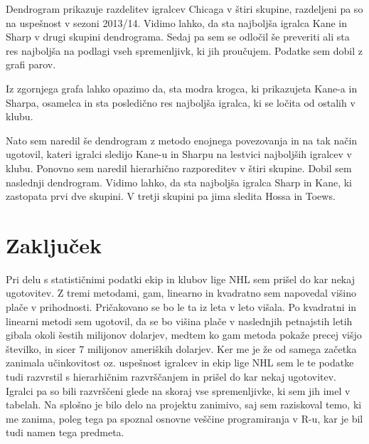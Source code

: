 \documentclass[11pt,a4paper]{article}
\begin{document}
Dendrogram prikazuje razdelitev igralcev Chicaga v štiri skupine, razdeljeni pa so na uspešnost v sezoni 2013/14. Vidimo lahko, da sta najboljša igralca Kane in Sharp v drugi skupini dendrograma. Sedaj pa sem se odločil še preveriti ali sta res najboljša na podlagi vseh spremenljivk, ki jih proučujem. Podatke sem dobil z grafi parov.


Iz zgornjega grafa lahko opazimo da, sta modra krogca, ki prikazujeta Kane-a in Sharpa, osamelca in sta posledično res najboljša igralca, ki se ločita od ostalih v klubu.


Nato sem naredil še dendrogram z metodo enojnega povezovanja in na tak način ugotovil, kateri igralci sledijo Kane-u in Sharpu na lestvici najboljših igralcev v klubu. Ponovno sem naredil hierarhično razporeditev v štiri skupine. Dobil sem naslednji dendrogram. Vidimo lahko, da sta najboljša igralca Sharp in Kane, ki zastopata prvi dve skupini. V tretji skupini pa jima sledita Hossa in Toews. 


\newpage
\section{Zaključek}

Pri delu s statističnimi podatki ekip in klubov lige NHL sem prišel do kar nekaj ugotovitev. Z tremi metodami, gam, linearno in kvadratno sem napovedal višino plače v prihodnosti. Pričakovano se bo le ta iz leta v leto višala. Po kvadratni in linearni metodi sem ugotovil, da se bo višina plače v naslednjih petnajstih letih gibala okoli šestih milijonov dolarjev, medtem ko gam metoda pokaže precej višjo številko, in sicer 7 milijonov ameriških dolarjev. Ker me je že od samega začetka zanimala učinkovitost oz. uspešnost igralcev in ekip lige NHL sem le te podatke tudi razvrstil s hierarhičnim razvrščanjem in prišel do kar nekaj ugotovitev. Igralci pa so bili razvrščeni glede na skoraj vse spremenljivke, ki sem jih imel v tabelah. Na splošno je bilo delo na projektu zanimivo, saj sem raziskoval temo, ki me zanima, poleg tega pa spoznal osnovne veščine programiranja v R-u, kar je bil tudi namen tega predmeta.

\begin{thebibliography}{9}
  \url{http://www.cbssports.com/mlb/salaries/avgsalaries}\\
  {Accessed: 01-03-2015}
  \url{http://www.nhl.com/ice/statshome.htm}\\
  {Accessed: 01-03-2015}
  \url{http://www.usatoday.com/sports/mlb/salaries/1988/team/all/}\\
  {{Accessed: 01-03-2015}
  \url{http://www.nhl.com/ice/teamstats.htm}\\
  {Accessed: 01-03-2015}
  \url{http://www.quanthockey.com/nhl/nationality-totals/nhl-players-2013-14-stats.html}\\
  {Accessed: 01-03-2015}
\end{thebibliography}
\end{document}

